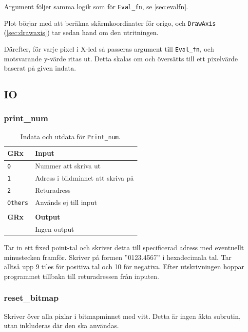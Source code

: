 \documentclass[]{article}
\begin{document}
\noindent
Argument följer samma logik som för \texttt{Eval\_fn}, se \ref{sec:evalfn}.

Plot börjar med att beräkna skärmkoordinater för origo, och \texttt{DrawAxis} (\ref{sec:drawaxis}) tar sedan hand om den utritningen.

Därefter, för varje pixel i X-led så passeras argument till \texttt{Eval\_fn}, och motsvarande y-värde ritas ut. Detta skalas om och översätts till ett pixelvärde baserat på given indata.

\subsection{IO}
\subsubsection{print\_num}

\begin{table}[H]
\centering
\begin{tabular}{ll}
	\textbf{GRx}    & \textbf{Input}                    \\ \hline
	\texttt{0}      & Nummer att skriva ut              \\
	\texttt{1}      & Adress i bildminnet att skriva på \\
	\texttt{2}      & Returadress                       \\
	\texttt{Others} & Används ej till input             \\
	                &  \\
	\textbf{GRx}    & \textbf{Output}                   \\ \hline
	                & Ingen output 			    \\
\end{tabular}
\caption{Indata och utdata för \texttt{Print\_num}.}
\end{table}


\noindent
Tar in ett fixed point-tal och skriver detta till specificerad adress med eventuellt minustecken framför. Skriver på formen ''0123.4567'' i hexadecimala tal. Tar alltså upp 9 tiles för positiva tal och 10 för negativa. Efter utskrivningen hoppar programmet tillbaka till returadressen från inputen.

\subsubsection{reset\_bitmap}
Skriver över alla pixlar i bitmapminnet med vitt. Detta är ingen äkta subrutin, utan inkluderas där den ska användas.
\end{document}
